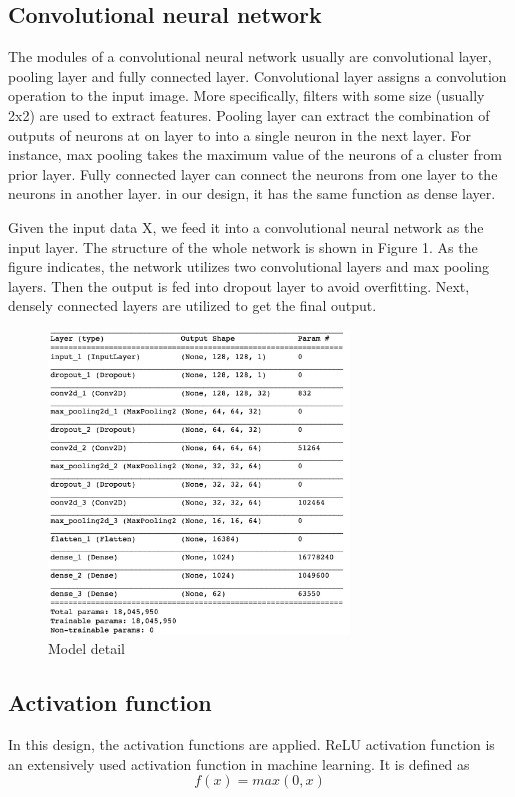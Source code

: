 \documentclass[twoside,twocolumn,10.8pt]{article}
\begin{document}
\subsection{Convolutional neural network}
The modules of a convolutional neural network usually are convolutional layer, pooling layer and fully connected layer. Convolutional layer assigns a convolution operation to the input image. More specifically, filters with some size (usually 2x2) are used to extract features. Pooling layer can extract the combination of outputs of neurons at on layer to into a single neuron in the next layer. For instance, max pooling takes the maximum value of the neurons of a cluster from prior layer. Fully connected layer can connect the neurons from one layer to the neurons in another layer. in our design, it has the same function as dense layer. 

\noindent Given the input data X, we feed it into a convolutional neural network as the input layer. The structure of the whole network is shown in Figure 1. As the figure indicates, the network utilizes two convolutional layers and max pooling layers. Then the output is fed into dropout layer to avoid overfitting. Next, densely connected layers are utilized to get the final output.

\begin{figure}[h]
\includegraphics[width=8cm]{model_detail.png}
\centering
\caption{Model detail}\label{fig1}
\end{figure}


\subsection{Activation function}

In this design, the activation functions are applied. 
ReLU activation function is an extensively used activation function in machine learning. It is defined as 
\begin{equation}
\label{eq:1}
f(x) = max(0,x)
\end{equation}
\end{document}
